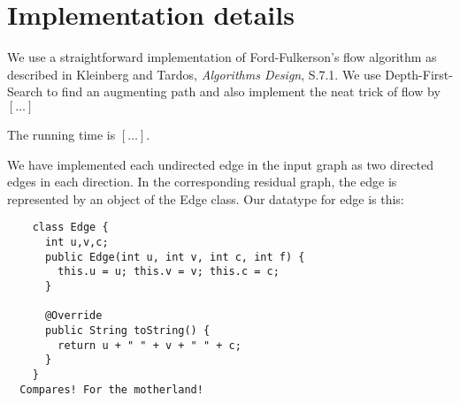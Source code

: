 \documentclass{tufte-handout}
\begin{document}
  \section{Implementation details}

  We use a straightforward implementation of Ford-Fulkerson's flow algorithm as described in Kleinberg and Tardos, \emph{Algorithms Design}, S.7.1.
  We use Depth-First-Search to find an augmenting path and also implement the neat trick of flow by $[\ldots]$

  The running time is $[\ldots]$.

  We have implemented each undirected edge in the input graph as two directed edges in each direction.
  In the corresponding residual graph, the edge is represented by an object of the Edge class.
  Our datatype for edge is this:
  \begin{verbatim}
    class Edge {
      int u,v,c;
      public Edge(int u, int v, int c, int f) {
        this.u = u; this.v = v; this.c = c;
      }

      @Override
      public String toString() {
        return u + " " + v + " " + c;
      }
    }
  Compares! For the motherland!
  \end{verbatim}
\end{document}
